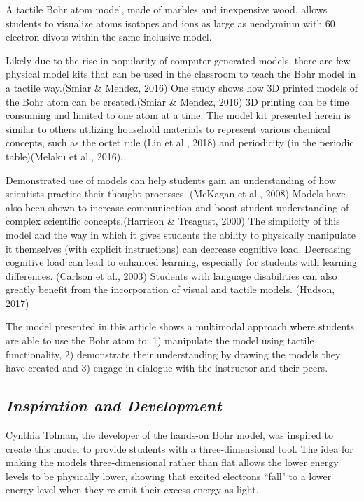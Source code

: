 \documentclass[11pt]{sig-alternate}
\begin{document}
\begin{large}
A tactile Bohr atom model, made of marbles and inexpensive wood, allows students to visualize atoms isotopes and ions as large as neo\-dymium with 60 electron divots within the same inclusive model. 

Likely due to the rise in popularity of computer-generated models, there are few physical model kits that can be used in the classroom to teach the Bohr model in a tactile way.(Smiar \& Mendez, 2016) One study shows how 3D printed models of the Bohr atom can be created.(Smiar \& Mendez, 2016) 3D printing can be time consuming and limited to one atom at a time. The model kit presented herein is similar to others utilizing household materials to represent various chemical concepts, such as the octet rule (Lin et al., 2018) and periodicity (in the periodic table)(Melaku et al., 2016). 

Demonstrated use of models can help students gain an understanding of how scientists practice their thought-processes. (McKagan et al., 2008) Models have also been shown to increase communication and boost student understanding of complex scientific concepts.(Harrison \& Treagust, 2000) The simplicity of this model and the way in which it gives students the ability to physically manipulate it themselves (with explicit instructions) can decrease cognitive load. Decreasing cognitive load can lead to enhanced learning, especially for students with learning differences. (Carlson et al., 2003) Students with language disabilities can also greatly benefit from the incorporation of visual and tactile models. (Hudson, 2017)

The model presented in this article shows a multimodal approach where students are able to use the Bohr atom to: 1) manipulate the model using tactile functionality, 2) demonstrate their understanding by drawing the models they have created and 3) engage in dialogue with the instructor and their peers.

\subsection*{\textit{Inspiration and Development}}
Cynthia Tolman, the developer of the hands-on Bohr model, was inspired to create this model to provide students with a three-dimensional tool. The idea for making the models three-dimensional rather than flat allows the lower energy levels to be physically lower, showing that excited electrons ``fall" to a lower energy level when they re-emit their excess energy as light.


\end{large}
\end{document}
